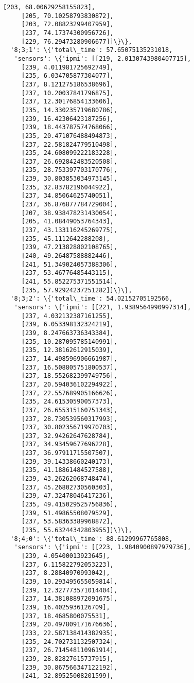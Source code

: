 \documentclass[11pt]{article}
\begin{document}
\begin{tcolorbox}[breakable, size=fbox, boxrule=.5pt, pad at break*=1mm, opacityfill=0]
\begin{Verbatim}[commandchars=\\\{\}]
     [203, 68.00629258155823],
     [205, 70.10258793830872],
     [203, 72.08823299407959],
     [237, 74.17374300956726],
     [229, 76.29473280906677]]\}\},
  '8;3;1': \{'total\_time': 57.65075135231018,
   'sensors': \{'ipmi': [[219, 2.0130743980407715],
     [239, 4.011981725692749],
     [235, 6.034705877304077],
     [237, 8.121275186538696],
     [237, 10.20037841796875],
     [237, 12.30176854133606],
     [235, 14.330235719680786],
     [239, 16.42306423187256],
     [239, 18.443787574768066],
     [235, 20.471076488494873],
     [237, 22.581824779510498],
     [235, 24.608099222183228],
     [237, 26.692842483520508],
     [235, 28.753397703170776],
     [239, 30.803853034973145],
     [235, 32.83782196044922],
     [237, 34.85064625740051],
     [237, 36.876877784729004],
     [207, 38.938478231430054],
     [205, 41.08449053764343],
     [237, 43.133116245269775],
     [235, 45.1112642288208],
     [239, 47.213828802108765],
     [240, 49.26487588882446],
     [241, 51.349024057388306],
     [237, 53.46776485443115],
     [241, 55.852275371551514],
     [235, 57.92924237251282]]\}\},
  '8;3;2': \{'total\_time': 54.02152705192566,
   'sensors': \{'ipmi': [[221, 1.9389564990997314],
     [237, 4.032132387161255],
     [239, 6.053398132324219],
     [239, 8.247663736343384],
     [235, 10.287095785140991],
     [235, 12.38162612915039],
     [237, 14.498596906661987],
     [237, 16.508805751800537],
     [237, 18.552682399749756],
     [237, 20.594036102294922],
     [237, 22.557689905166626],
     [235, 24.61530590057373],
     [237, 26.655315160751343],
     [237, 28.730539560317993],
     [237, 30.802356719970703],
     [237, 32.94262647628784],
     [237, 34.93459677696228],
     [237, 36.97911715507507],
     [239, 39.14338660240173],
     [235, 41.18861484527588],
     [239, 43.26262068748474],
     [237, 45.26802730560303],
     [239, 47.32478046417236],
     [235, 49.415029525756836],
     [239, 51.49865508079529],
     [237, 53.58363389968872],
     [235, 55.63244342803955]]\}\},
  '8;4;0': \{'total\_time': 88.61299967765808,
   'sensors': \{'ipmi': [[223, 1.9840900897979736],
     [239, 4.05400013923645],
     [237, 6.115822792053223],
     [237, 8.28840970993042],
     [239, 10.293495655059814],
     [239, 12.327773571014404],
     [237, 14.381088972091675],
     [239, 16.4025936126709],
     [237, 18.4685800075531],
     [239, 20.497809171676636],
     [233, 22.587138414382935],
     [235, 24.702731132507324],
     [237, 26.714548110961914],
     [239, 28.82827615737915],
     [239, 30.867566347122192],
     [241, 32.89525008201599],

\end{Verbatim}
\end{tcolorbox}
\end{document}
